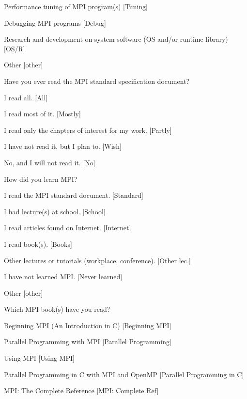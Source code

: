 \documentclass[conference,10pt,letterpaper]{IEEEtran}
\begin{document}
{{\begin{description}
\begin{inparaenum}[{\bf C}1)]
    \item Performance tuning of MPI program(s) [Tuning]
    \item Debugging MPI programs [Debug]
    \item Research and development on system software (OS and/or runtime
      library) [OS/R]
    \item Other [other]
    \end{inparaenum}
  \item[Q9:] Have you ever read the MPI standard specification document?
    \begin{inparaenum}[{\bf C}1)]
    \item I read all. [All]
    \item I read most of it. [Mostly]
    \item I read only the chapters of interest for my work. [Partly]
    \item I have not read it, but I plan to. [Wish]
    \item No, and I will not read it. [No]
    \end{inparaenum}
  \item[Q10*:] How did you learn MPI?
    \begin{inparaenum}[{\bf C}1)]
    \item I read the MPI standard document. [Standard]
    \item I had lecture(s) at school. [School]
    \item I read articles found on Internet. [Internet]
    \item I read book(s). [Books]
    \item Other lectures or tutorials (workplace, conference). [Other lec.]
    \item I have not learned MPI. [Never learned]
    \item Other [other]
    \end{inparaenum}
  \item[Q11*:] Which MPI book(s) have you read?
    \begin{inparaenum}[{\bf C}1)]
    \item Beginning MPI (An Introduction in C) [Beginning MPI]
    \item Parallel Programming with MPI [Parallel Programming]
    \item Using MPI [Using MPI]
    \item Parallel Programming in C with MPI and OpenMP [Parallel
      Programming in C]
    \item MPI: The Complete Reference [MPI: Complete Ref]

\end{inparaenum}
\end{description}}}
\end{document}
